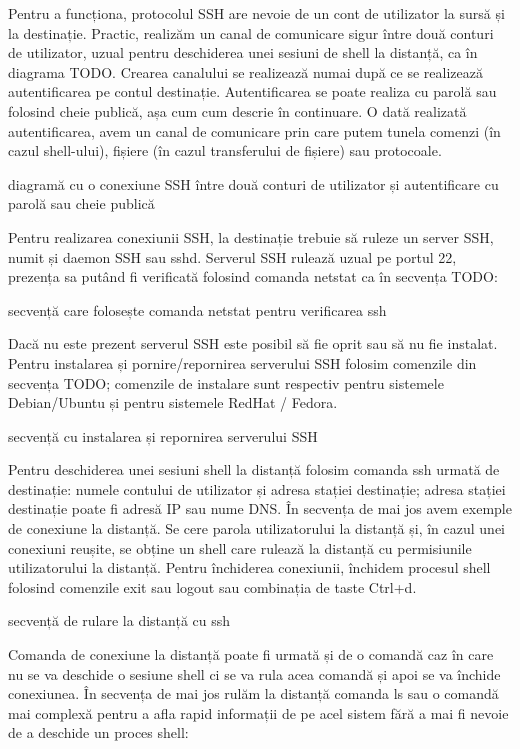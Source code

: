 Pentru a funcționa, protocolul SSH are nevoie de un cont de utilizator la sursă și la destinație. Practic, realizăm un canal de comunicare sigur între două conturi de utilizator, uzual pentru deschiderea unei sesiuni de shell la distanță, ca în diagrama TODO. Crearea canalului se realizează numai după ce se realizează autentificarea pe contul destinație. Autentificarea se poate realiza cu parolă sau folosind cheie publică, așa cum cum descrie în continuare. O dată realizată autentificarea, avem un canal de comunicare prin care putem tunela comenzi (în cazul shell-ului), fișiere (în cazul transferului de fișiere) sau protocoale.

diagramă cu o conexiune SSH între două conturi de utilizator și autentificare cu parolă sau cheie publică

Pentru realizarea conexiunii SSH, la destinație trebuie să ruleze un server SSH, numit și daemon SSH sau sshd. Serverul SSH rulează uzual pe portul 22, prezența sa putând fi verificată folosind comanda netstat ca în secvența TODO:

secvență care folosește comanda netstat pentru verificarea ssh

Dacă nu este prezent serverul SSH este posibil să fie oprit sau să nu fie instalat. Pentru instalarea și pornire/repornirea serverului SSH folosim comenzile din secvența TODO; comenzile de instalare sunt respectiv pentru sistemele Debian/Ubuntu și pentru sistemele RedHat / Fedora.

secvență cu instalarea și repornirea serverului SSH

Pentru deschiderea unei sesiuni shell la distanță folosim comanda ssh urmată de destinație: numele contului de utilizator și adresa stației destinație; adresa stației destinație poate fi adresă IP sau nume DNS. În secvența de mai jos avem exemple de conexiune la distanță. Se cere parola utilizatorului la distanță și, în cazul unei conexiuni reușite, se obține un shell care rulează la distanță cu permisiunile utilizatorului la distanță. Pentru închiderea conexiunii, închidem procesul shell folosind comenzile exit sau logout sau combinația de taste Ctrl+d.

secvență de rulare la distanță cu ssh

Comanda de conexiune la distanță poate fi urmată și de o comandă caz în care nu se va deschide o sesiune shell ci se va rula acea comandă și apoi se va închide conexiunea. În secvența de mai jos rulăm la distanță comanda ls sau o comandă mai complexă pentru a afla rapid informații de pe acel sistem fără a mai fi nevoie de a deschide un proces shell:

